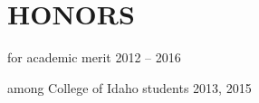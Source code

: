 \documentclass[margin]{res}
\begin{document}
\begin{resume}
\begin{multicols}{2}
\end{multicols}

\section{HONORS} \vspace{10pt}

\begin{description}[noitemsep,topsep=0pt]
\item[Heritage Scholarship] for academic merit \hfill 2012 -- 2016
\item[Top Putnam Score] among College of Idaho students \hfill 2013, 2015
\end{description}

\end{resume}
\end{document}
